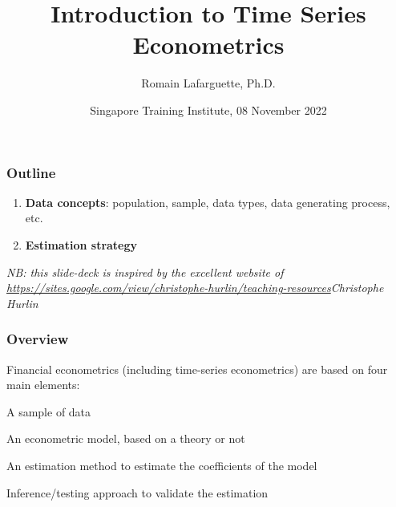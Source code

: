 \documentclass{beamer}
\title[Concepts]{Introduction to Time Series Econometrics}
\author[R. Lafarguette]{Romain Lafarguette, Ph.D.}
\institute[IMF]{Quant \& IMF External Consultant}
\date[STI, 08 Nov 2022]{Singapore Training Institute, 08 November 2022}
\newenvironment{wideenumerate}{\enumerate\addtolength{\itemsep}{10pt}}{\endenumerate}
\begin{document}
\begingroup
\renewcommand{\insertframenumber}{}
\begin{frame}
\maketitle
\end{frame}
\endgroup


\begin{frame}
  \frametitle{Outline}
  \begin{enumerate}
  \item \textbf{Data concepts}: population, sample, data types, data generating process, etc.
  \item \textbf{Estimation strategy}
  \end{enumerate}


\smallskip
\emph{NB: this slide-deck is inspired by the excellent website of \url{https://sites.google.com/view/christophe-hurlin/teaching-resources}{Christophe Hurlin}}  
\end{frame}




\begin{frame}
  \frametitle{Overview}

Financial econometrics (including time-series econometrics) are based on four main elements:\\
\smallskip

  \begin{wideenumerate}
    \item A sample of data
    \item An econometric model, based on a theory or not
    \item An estimation method to estimate the coefficients of the model
    \item Inference/testing approach to validate the estimation
  \end{wideenumerate}
  
\end{frame}
\end{document}
